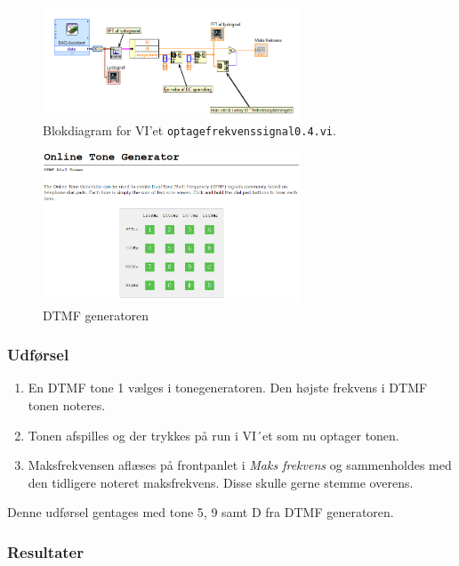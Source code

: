 		\begin{figure}[htb]

			\centering
			\includegraphics[width=3in]{optagefrekvenssignal04}
			\caption{Blokdiagram for VI'et \texttt{optagefrekvenssignal0.4.vi}.}
			\label{fig:vio4}
		\end{figure}
		
		\begin{figure}[htb]

			\centering
			\includegraphics[width=3in]{DTMF}
			\caption{DTMF generatoren}
			\label{fig:DTMF}
		\end{figure}
	
		\subsubsection{Udførsel}
			\begin{enumerate}
			\item En DTMF tone 1 vælges i tonegeneratoren. Den højste frekvens i DTMF tonen noteres.
			\item  Tonen afspilles og der trykkes på run i VI´et som nu optager tonen.
			\item Maksfrekvensen aflæses på frontpanlet i \textit{Maks frekvens} og sammenholdes med den tidligere noteret maksfrekvens. Disse skulle gerne stemme overens. 
			\end{enumerate}
			Denne udførsel gentages med tone 5, 9 samt D fra DTMF generatoren.
	
			
		\subsubsection{Resultater}
		
